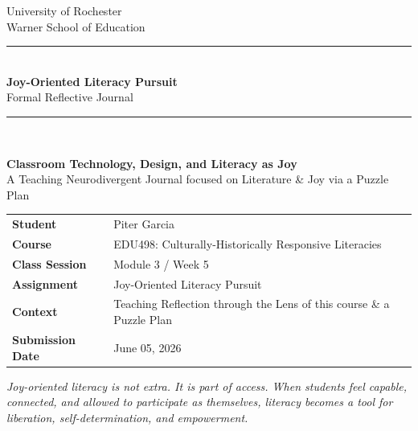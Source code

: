 \documentclass[11pt]{article}
\begin{document}
\begin{titlepage}
\thispagestyle{empty}

\begin{center}
    \vspace*{0.25in}
    {\large University of Rochester\\}
    {\normalsize Warner School of Education\\[0.35in]}

    {\color{PrimaryRed}\rule{\textwidth}{1.4pt}}\\[0.22in]
    {\Huge\bfseries Joy-Oriented Literacy Pursuit\\[0.12in]}
    {\Large Formal Reflective Journal\\[0.22in]}
    {\color{PrimaryRed}\rule{0.72\textwidth}{0.7pt}}\\[0.32in]

    \colorbox{SoftBlue}{%
        \parbox{0.86\textwidth}{%
            \centering\vspace{0.12in}
            \textbf{Classroom Technology, Design, and Literacy as Joy}\\[0.05in]
            A Teaching Neurodivergent Journal focused on Literature \& Joy via a Puzzle Plan
            \vspace{0.12in}
        }%
    }
\end{center}

\vspace{0.75in}

\begin{center}
\renewcommand{\arraystretch}{1.35}
\begin{tabular}{>{\bfseries\RaggedLeft}p{1.55in} p{4.85in}}
Student & Piter Garcia \\
Course & EDU498: Culturally-Historically Responsive Literacies \\
Class Session & Module 3 / Week 5 \\
Assignment & Joy-Oriented Literacy Pursuit \\
Context & Teaching Reflection through the Lens of this course \& a Puzzle Plan\\
Submission Date & June 05, 2026 \\
\end{tabular}
\end{center}

\vfill

\begin{center}
\begin{minipage}{0.7\textwidth}
\centering
\itshape
Joy-oriented literacy is not extra. It is part of access. When students feel capable, connected, and allowed to participate as themselves, literacy becomes a tool for liberation, self-determination, and empowerment.
\end{minipage}
\end{center}

\restoregeometry
\end{titlepage}
\clearpage
\end{document}
